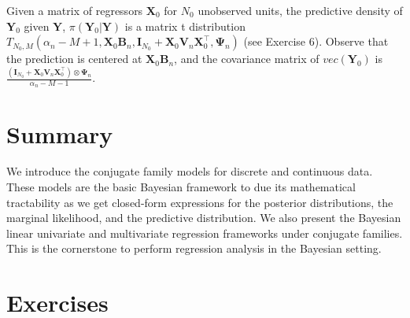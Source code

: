 Given a matrix of regressors ${\bm{X}}_0$ for $N_0$ unobserved units, the predictive density of ${\bm{Y}}_0$ given ${\bm{Y}}$, $\pi({\bm{Y}}_0|{\bm{Y}})$ is a matrix t distribution $T_{N_0,M}(\alpha_n-M+1,{\bm{X}}_0{\bm{B}}_n,{\bm{I}}_{N_0}+{\bm{X}}_0{\bm{V}}_n{\bm{X}}_0^{\top},{\bm{\Psi}}_n)$ (see Exercise 6). Observe that the prediction is centered at ${\bm{X}}_0{\bm{B}}_n$, and the covariance matrix of $vec({\bm{Y}}_0)$ is $\frac{({\bm{I}}_{N_0}+{\bm{X}}_0{\bm{V}}_n{\bm{X}}_0^{\top})\otimes{\bm{\Psi}}_n}{\alpha_n-M-1}$.  

\section{Summary}\label{sec45}
We introduce the conjugate family models for discrete and continuous data. These models are the basic Bayesian framework to due its mathematical tractability as we get closed-form expressions for the posterior distributions, the marginal likelihood, and the predictive distribution. We also present the Bayesian linear univariate and multivariate regression frameworks under conjugate families. This is the cornerstone to perform regression analysis in the Bayesian setting. 

\section{Exercises}\label{sec46}

